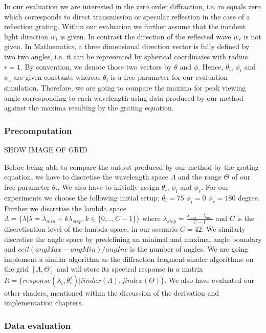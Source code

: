 In our evaluation we are interested in the zero order diffraction, i.e. m equals zero which corresponds to direct transmission or specular reflection in the case of a reflection grating. 
Within our evaluation we further assume that the incident light direction $w_i$ is given. In contrast the direction of the reflected wave $w_r$ is not given.
In Mathematics, a three dimensional direction vector is fully defined by two two angles, i.e. it can be represented by spherical coordinates with radius $r = 1$. By convention, we denote those two vectors by $\theta$ and $\phi$. Hence, $\theta_i$, $\phi_i$ and $\phi_r$ are given constants whereas $\theta_i$ is a free parameter for our evaluation simulation. Therefore, we are going to compare the maxima for peak viewing angle corresponding to each wavelength using data produced by our method against the maxima resulting by the grating equation.

\subsubsection{Precomputation}
SHOW IMAGE OF GRID

Before being able to compare the output produced by our method by the grating equation, we have to discretise the wavelength space $\Lambda$ and the range $\Theta$ of our free parameter $\theta_i$. We also have to initially assign  $\theta_i$, $\phi_i$ and $\phi_r$. For our experiments we choose the following initial setup: $\theta_i = 75$ $\phi_i = 0$ $\phi_r = 180$ degree.
Further we discretise the lambda space $\Lambda = \{\lambda | \lambda = \lambda_{min} + k\lambda_{step}, k \in \{0,..,C-1\}\}$ where $\lambda_{step} = \frac{\lambda_{max}-\lambda_{min}}{C-1}$ and $C$ is the discretisation level of the lambda space, in our scenario $C = 42$. We similarly discretise the angle space by predefining an minimal and maximal angle boundary and $ceil(angMax - angMin) / angInc$ is the number of angles. 
We are going implement a similar algorithm as the diffraction fragment shader algorithme on the grid $[\Lambda, \Theta]$ and will store its spectral response in a matrix $R = \{response(\lambda_i, \theta_{r}^{j}) | i index(\Lambda), j index(\Theta)\}$. We also have evaluated our other shaders, mentioned within the discussion of the derivation and implementation chapters.

\subsubsection{Data evaluation}

